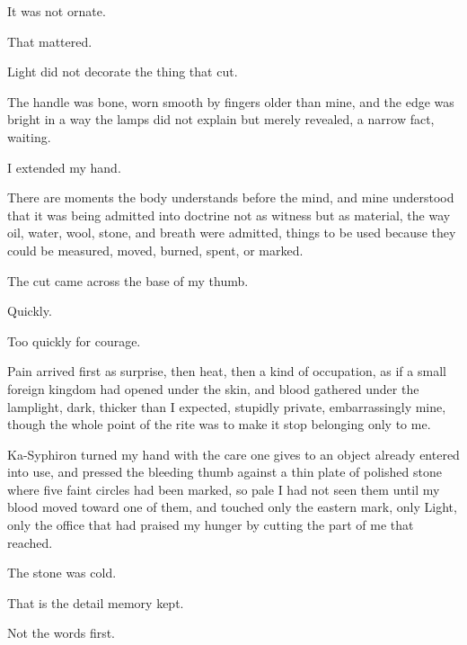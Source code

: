 It was not ornate.\par

That mattered.\par

Light did not decorate the thing that cut.\par

The handle was bone, worn smooth by fingers older than mine, and the edge was bright in a way the lamps did not explain but merely revealed, a narrow fact, waiting.\par

I extended my hand.\par

There are moments the body understands before the mind, and mine understood that it was being 
admitted into doctrine not as witness but as material, the way oil, water, wool, stone, and 
breath were admitted, things to be used because they could be measured, moved, burned, spent, 
or marked.\par

The cut came across the base of my thumb.\par

Quickly.\par

Too quickly for courage.\par

Pain arrived first as surprise, then heat, then a kind of occupation, as if a small foreign kingdom 
had opened under the skin, and blood gathered under the lamplight, dark, thicker than I expected, 
stupidly private, embarrassingly mine, though the whole point of the rite was to make it stop belonging only to me.\par

Ka-Syphiron turned my hand with the care one gives to an object already entered into use, and pressed 
the bleeding thumb against a thin plate of polished stone where five faint circles had been marked, 
so pale I had not seen them until my blood moved toward one of them, and touched only the eastern mark, 
only Light, only the office that had praised my hunger by cutting the part of me that reached.\par

The stone was cold.\par

That is the detail memory kept.\par

Not the words first.\par

